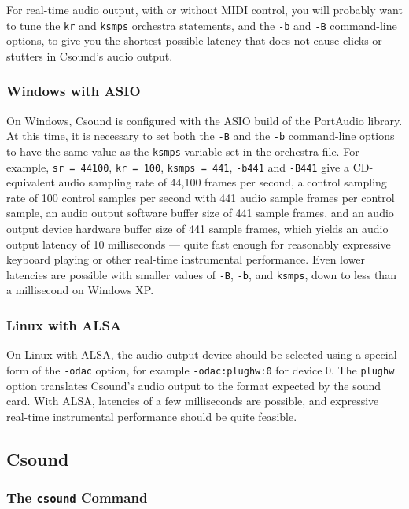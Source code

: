 \documentclass[10pt,letterpaper,onecolumn]{ltxguide}
\begin{document}
For real-time audio output, with or without MIDI control, you will probably want to tune the \texttt{kr} and \texttt{ksmps} orchestra statements, and the \texttt{-b} and \texttt{-B} command-line options, to give you the shortest possible latency that does not cause clicks or stutters in Csound's audio output. 

\subsubsection{Windows with ASIO}

On Windows, Csound is configured with the ASIO build of the PortAudio library. At this time, it is necessary to set both the \texttt{-B} and the \texttt{-b} command-line options to have the same value as the \texttt{ksmps} variable set in the orchestra file. For example, \texttt{sr = 44100}, \texttt{kr = 100}, \texttt{ksmps = 441}, \texttt{-b441} and \texttt{-B441} give a CD-equivalent audio sampling rate of 44,100 frames per second, a control sampling rate of 100 control samples per second with 441 audio sample frames per control sample, an audio output software buffer size of 441 sample frames, and an audio output device hardware buffer size of 441 sample frames, which yields an audio output latency of 10 milliseconds --- quite fast enough for reasonably expressive keyboard playing or other real-time instrumental performance. Even lower latencies are possible with smaller values of \texttt{-B}, \texttt{-b}, and \texttt{ksmps}, down to less than a millisecond on Windows XP.

\subsubsection{Linux with ALSA}

On Linux with ALSA, the audio output device should be selected using a special form of the \texttt{-odac} option, for example \texttt{-odac:plughw:0} for device 0. The \texttt{plughw} option translates Csound's audio output to the format expected by the sound card. With ALSA, latencies of a few milliseconds are possible, and expressive real-time instrumental performance should be quite feasible.

\subsection{Csound}

\subsubsection{The \texttt{csound} Command}
\end{document}

